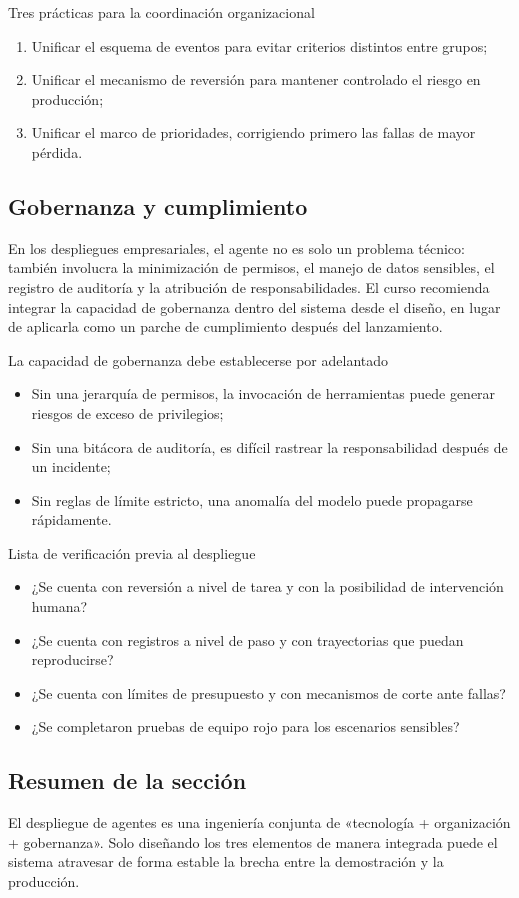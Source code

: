 \begin{importantbox}{Tres prácticas para la coordinación organizacional}
\begin{enumerate}
    \item Unificar el esquema de eventos para evitar criterios distintos entre grupos;
    \item Unificar el mecanismo de reversión para mantener controlado el riesgo en producción;
    \item Unificar el marco de prioridades, corrigiendo primero las fallas de mayor pérdida.
\end{enumerate}
\end{importantbox}

\subsection{Gobernanza y cumplimiento}
En los despliegues empresariales, el agente no es solo un problema técnico: también involucra la minimización de permisos, el manejo de datos sensibles, el registro de auditoría y la atribución de responsabilidades. El curso recomienda integrar la capacidad de gobernanza dentro del sistema desde el diseño, en lugar de aplicarla como un parche de cumplimiento después del lanzamiento.

\begin{warningbox}{La capacidad de gobernanza debe establecerse por adelantado}
\begin{itemize}
    \item Sin una jerarquía de permisos, la invocación de herramientas puede generar riesgos de exceso de privilegios;
    \item Sin una bitácora de auditoría, es difícil rastrear la responsabilidad después de un incidente;
    \item Sin reglas de límite estricto, una anomalía del modelo puede propagarse rápidamente.
\end{itemize}
\end{warningbox}

\begin{knowledgebox}{Lista de verificación previa al despliegue}
\begin{itemize}
    \item ¿Se cuenta con reversión a nivel de tarea y con la posibilidad de intervención humana?
    \item ¿Se cuenta con registros a nivel de paso y con trayectorias que puedan reproducirse?
    \item ¿Se cuenta con límites de presupuesto y con mecanismos de corte ante fallas?
    \item ¿Se completaron pruebas de equipo rojo para los escenarios sensibles?
\end{itemize}
\end{knowledgebox}

\subsection{Resumen de la sección}
El despliegue de agentes es una ingeniería conjunta de «tecnología + organización + gobernanza». Solo diseñando los tres elementos de manera integrada puede el sistema atravesar de forma estable la brecha entre la demostración y la producción.
